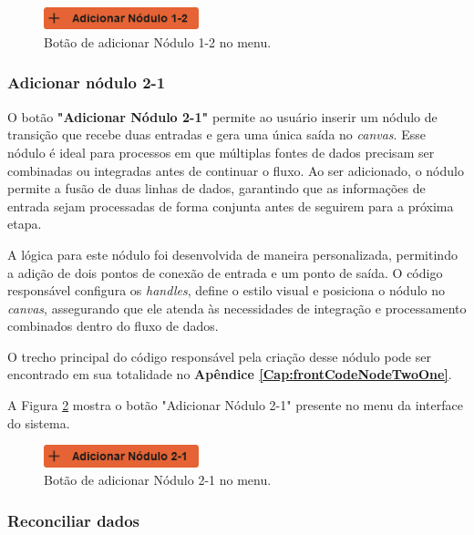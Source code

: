 \begin{figure}[htbp]
    \centering
    \includegraphics[width=0.4\textwidth]{figuras/add-node12-button.png}
    \caption{Botão de adicionar Nódulo 1-2 no menu.}
    \label{Fig:AddNodeOneTwoButton}
\end{figure}

\subsubsection{Adicionar nódulo 2-1}

O botão \textbf{"Adicionar Nódulo 2-1"} permite ao usuário inserir um nódulo de transição que recebe duas entradas e gera uma única saída no \textit{canvas}. Esse nódulo é ideal para processos em que múltiplas fontes de dados precisam ser combinadas ou integradas antes de continuar o fluxo. Ao ser adicionado, o nódulo permite a fusão de duas linhas de dados, garantindo que as informações de entrada sejam processadas de forma conjunta antes de seguirem para a próxima etapa.

A lógica para este nódulo foi desenvolvida de maneira personalizada, permitindo a adição de dois pontos de conexão de entrada e um ponto de saída. O código responsável configura os \textit{handles}, define o estilo visual e posiciona o nódulo no \textit{canvas}, assegurando que ele atenda às necessidades de integração e processamento combinados dentro do fluxo de dados.

O trecho principal do código responsável pela criação desse nódulo pode ser encontrado em sua totalidade no \textbf{Apêndice \ref{Cap:frontCodeNodeTwoOne}}.

A Figura \ref{Fig:AddNodeTwoOneButton} mostra o botão "Adicionar Nódulo 2-1" presente no menu da interface do sistema.

\begin{figure}[htbp]
    \centering
    \includegraphics[width=0.4\textwidth]{figuras/add-node21-button.png}
    \caption{Botão de adicionar Nódulo 2-1 no menu.}
    \label{Fig:AddNodeTwoOneButton}
\end{figure}

\subsubsection{Reconciliar dados}

